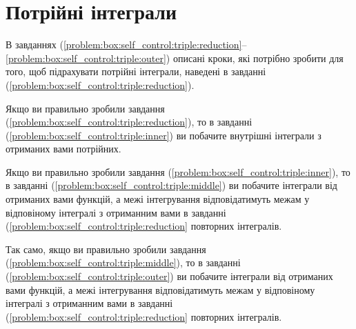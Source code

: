\section{Потрійні інтеграли}
В завданнях (\ref{problem:box:self_control:triple:reduction}--\ref{problem:box:self_control:triple:outer}) описані кроки, які потрібно зробити для того, щоб підрахувати потрійні інтеграли, наведені в завданні  (\ref{problem:box:self_control:triple:reduction}).

Якщо ви правильно зробили завдання  (\ref{problem:box:self_control:triple:reduction}), то в завданні (\ref{problem:box:self_control:triple:inner}) ви побачите внутрішні інтеграли з отриманих вами потрійних.

Якщо ви правильно зробили завдання  (\ref{problem:box:self_control:triple:inner}), то в завданні (\ref{problem:box:self_control:triple:middle}) ви побачите інтеграли від отриманих вами функцій, а межі інтегрування відповідатимуть межам у відповіному інтегралі з отриманним вами в завданні (\ref{problem:box:self_control:triple:reduction} повторних інтегралів.

Так само, якщо ви правильно зробили завдання  (\ref{problem:box:self_control:triple:middle}), то в завданні (\ref{problem:box:self_control:triple:outer}) ви побачите інтеграли від отриманих вами функцій, а межі інтегрування відповідатимуть межам у відповіному інтегралі з отриманним вами в завданні (\ref{problem:box:self_control:triple:reduction} повторних інтегралів.

